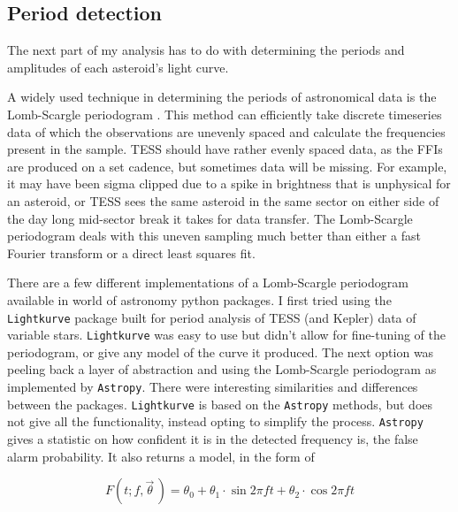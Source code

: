 \documentclass{UCreport}
\begin{document}
\subsection{Period detection}\label{SubSec:Periods}


The next part of my analysis has to do with determining the periods and amplitudes of each asteroid's light curve.

A widely used technique in determining the periods of astronomical data is the Lomb-Scargle periodogram \citep[\citet{Lomb1976,Scargle1982}, but see][for a review]{VanderPlas2018}.
This method can efficiently take discrete timeseries data of which the observations are unevenly spaced and calculate the frequencies present in the sample.
TESS should have rather evenly spaced data, as the FFIs are produced on a set cadence, but sometimes data will be missing.
For example, it may have been sigma clipped due to a spike in brightness that is unphysical for an asteroid, or TESS sees the same asteroid in the same sector on either side of the day long mid-sector break it takes for data transfer.
The Lomb-Scargle periodogram deals with this uneven sampling much better than either a fast Fourier transform or a direct least squares fit.

There are a few different implementations of a Lomb-Scargle periodogram available in world of astronomy python packages.
I first tried using the \texttt{Lightkurve} \citep{Lightkurve2018} package built for period analysis of TESS (and Kepler) data of variable stars.
\texttt{Lightkurve} was easy to use but didn't allow for fine-tuning of the periodogram, or give any model of the curve it produced.
The next option was peeling back a layer of abstraction and using the Lomb-Scargle periodogram as implemented by \texttt{Astropy}\citep[\citet{Astropy2022} but see][for the implementation]{Vanderplas2012,Vanderplas2015}.
There were interesting similarities and differences between the packages.
\texttt{Lightkurve} is based on the \texttt{Astropy} methods, but does not give all the functionality, instead opting to simplify the process.
\texttt{Astropy} gives a statistic on how confident it is in the detected frequency is, the false alarm probability.
It also returns a model, in the form of

\begin{equation}
  \label{Eq:LCModel}
  F(t;f,\vec{\theta}\,) = \theta_0 + \theta_1\cdot\sin{2\pi ft} +\theta_2\cdot\cos{2\pi ft}
\end{equation}
\end{document}
